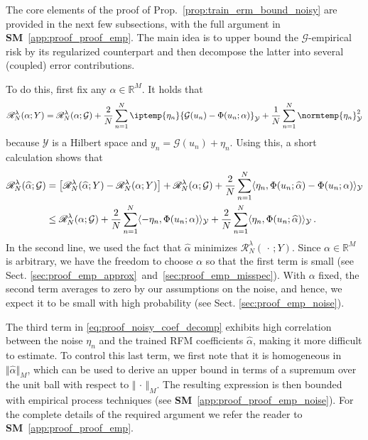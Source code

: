 \documentclass{article}
\theoremstyle{plain}
\theoremstyle{my_def}
\theoremstyle{my_rem}
\numberwithin{equation}{section}
\numberwithin{theorem}{section}%
\newcommand{\R}{\mathbb{R}}
\newcommand{\scrR}{\mathscr{R}}
\newcommand{\cG}{\mathcal{G}}
\newcommand{\cY}{\mathcal{Y}}
\let\originalleft\left %
\let\originalright\right
\renewcommand{\left}{\mathopen{}\mathclose\bgroup\originalleft}
\renewcommand{\right}{\aftergroup\egroup\originalright}
\newcommand{\ip}{\iptemp}
\newcommand{\norm}{\normtemp}
\renewcommand{\hat}{\widehat}
\newcommand{\slot}{{\,\cdot\,}}
\newcommand{\al}{\alpha}
\newcommand{\alhat}{\hat{\al}}
\begin{document}
The core elements of the proof of Prop.~\ref{prop:train_erm_bound_noisy} are provided in the next few subsections, with the full argument in {\bf SM}~\ref{app:proof_proof_emp}. The main idea is to upper bound the $\cG$-empirical risk by its regularized counterpart and then decompose the latter into several (coupled) error contributions.

To do this, first fix any $\alpha\in\R^M$. It holds that
\begin{equation}\label{eq:proof_emp_expand}
    \scrR_N^{\lambda}(\alpha;Y)
    = \scrR_N^{\lambda}(\alpha;\cG) + \frac{2}{N}\sum_{n=1}^N\ip{\eta_n}{\cG(u_n)-\Phi(u_n;\alpha)}_{\cY} + \frac{1}{N}\sum_{n=1}^N\norm{\eta_n}_{\cY}^2
\end{equation}
because $\cY$ is a Hilbert space and $y_n=\cG(u_n)+\eta_n$.
Using this, a short calculation shows that
\begin{align}\label{eq:proof_noisy_coef_decomp}
        \scrR_N^\lambda(\hat{\alpha};\cG) 
        &= \left[\scrR_N^\lambda(\hat{\alpha};Y) - \scrR_N^\lambda(\alpha;Y)\right]
        + \scrR_N^\lambda(\alpha;\cG) + \frac2N \sum_{n=1}^N \langle \eta_n, \Phi(u_n;\hat{\alpha}) - \Phi(u_n;\alpha)\rangle_{\cY} 
        \notag
        \\
        &\le \scrR_N^\lambda(\alpha;\cG) + 
        \frac2N \sum_{n=1}^N \langle -\eta_n, \Phi(u_n;\alpha)\rangle_{\cY}
        + \frac2N \sum_{n=1}^N \langle \eta_n, \Phi(u_n;\hat{\alpha})\rangle_{\cY}\,.
\end{align}
In the second line, we used the fact that $\hat{\alpha}$ minimizes $\scrR_N^\lambda(\slot;Y)$. Since $\al\in\R^M$ is arbitrary, we have the freedom to choose $\alpha$ so that the first term is small (see Sect. \ref{sec:proof_emp_approx}~and~\ref{sec:proof_emp_misspec}). With $\alpha$ fixed, the second term averages to zero by our assumptions on the noise, and hence, we expect it to be small with high probability (see Sect. \ref{sec:proof_emp_noise}).

The third term in \eqref{eq:proof_noisy_coef_decomp} exhibits high correlation between the noise $\eta_n$ and the trained RFM coefficients $\alhat$, making it more difficult to estimate.
To control this last term, we first note that it is homogeneous in $\Vert \hat{\alpha}\Vert_M$, which can be used to derive an upper bound in terms of a supremum over the unit ball with respect to $\Vert \slot \Vert_M$. The resulting expression is then bounded with empirical process techniques (see {\bf SM}~\ref{app:proof_proof_emp_noise}). For the complete details of the required argument we refer the reader to {\bf SM}~\ref{app:proof_proof_emp}. 
\end{document}
